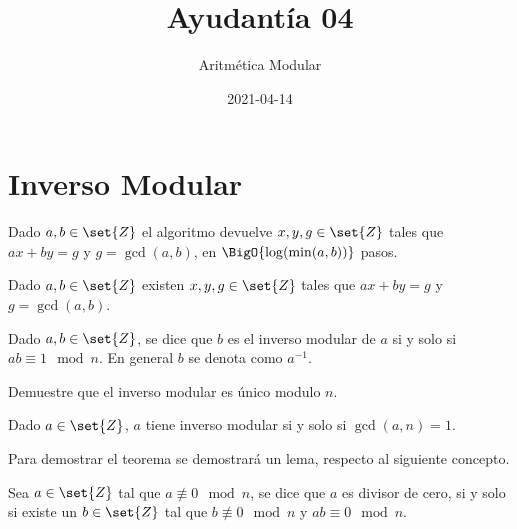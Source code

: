 \documentclass{ayudantia}
\title{Ayudantía 04}
\subtitle{Aritmética Modular}
\date{2021-04-14}
\begin{document}
\maketitle
\section{Inverso Modular}
\begin{thm}
    Dado \(a,b\in\set{Z}\) el algoritmo devuelve \(x,y,g\in\set{Z}\) tales que \(ax+by=g\) y \(g=\gcd(a,b)\), en \(\BigO{\log(\min(a,b))}\) pasos.
\end{thm}

\begin{cor}[Bezout]
    Dado \(a,b\in\set{Z}\) existen \(x,y,g\in\set{Z}\) tales que \(ax+by=g\) y \(g=\gcd(a,b)\).
\end{cor}

\begin{defn}
    Dado \(a,b\in\set{Z}\), se dice que \(b\) es el inverso modular de \(a\) si y solo si \(ab\equiv 1\mod n\). En general \(b\) se denota como \(a^{-1}\).
\end{defn}

\begin{prob}
    Demuestre que el inverso modular es único modulo \(n\).
\end{prob}

\begin{thm}
    Dado \(a\in\set{Z}\), \(a\) tiene inverso modular si y solo si \(\gcd(a,n)=1\).
\end{thm}
Para demostrar el teorema se demostrará un lema, respecto al siguiente concepto.
\begin{defn}
    Sea \(a\in\set{Z}\) tal que \(a\not\equiv0\mod n\), se dice que \(a\) es divisor de cero, si y solo si existe un \(b\in\set{Z}\) tal que \(b\not\equiv 0\mod n\) y \(ab\equiv0\mod n\).
\end{defn}
\end{document}
